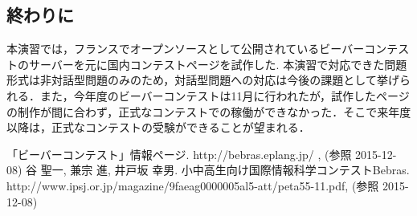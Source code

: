 \documentclass[a4paper]{jarticle}
\begin{document}
\begin{multicols}{2}
\section{終わりに}
本演習では，フランスでオープンソースとして公開されているビーバーコンテストのサーバーを元に国内コンテストページを試作した. 本演習で対応できた問題形式は非対話型問題のみのため，対話型問題への対応は今後の課題として挙げられる．また，今年度のビーバーコンテストは11月に行われたが，試作したページの制作が間に合わず，正式なコンテストでの稼働ができなかった．そこで来年度以降は，正式なコンテストの受験ができることが望まれる．

\end{multicols}

\begin{thebibliography}{1}

 「ビーバーコンテスト」情報ページ.  http://bebras.eplang.jp/ , (参照 2015-12-08)
 谷 聖一, 兼宗 進, 井戸坂 幸男. 小中高生向け国際情報科学コンテストBebras.  http://www.ipsj.or.jp/magazine/9faeag0000005al5-att/peta55-11.pdf, (参照 2015-12-08)



\end{thebibliography}
\end{document}
